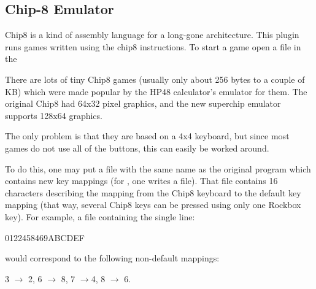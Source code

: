 \subsection{\label{ref:Chip8emulator}Chip{}-8 Emulator}
Chip8 is a kind of assembly language for a long-gone architecture.
This plugin runs games written using the chip8 instructions.
To start a game open a  file in the 

There are lots of tiny Chip8 games (usually only about 256 bytes to a
couple of KB) which were made popular by the HP48
calculator's emulator for them. The original Chip8 had
64x32 pixel graphics, and the new superchip emulator supports 128x64
graphics.

The only problem is that they are based on a 4x4 keyboard, but since most
games do not use all of the buttons, this can easily be worked around.

To do this, one may put a  file with the same name as the
original program which contains new key mappings (for , one
writes a  file). That  file contains 16
characters describing the mapping from the Chip8 keyboard to the default key
mapping (that way, several Chip8 keys can be pressed using only one
Rockbox key). For example, a file containing the single line:
\begin{code}
    0122458469ABCDEF
\end{code}
would correspond to the following non-default mappings:

3 $\rightarrow$ 2, 6 $\rightarrow$ 8, 7 $\rightarrow$4, 8 $\rightarrow$ 6.

